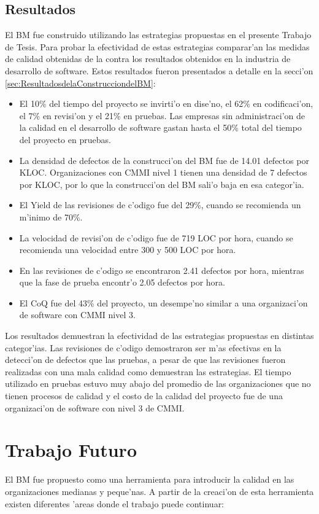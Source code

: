 \subsection{Resultados}
\label{sec:Resultados}
\noindent
El BM fue construido utilizando las estrategias propuestas en el presente Trabajo de Tesis. Para probar la efectividad de estas estrategias comparar'an las medidas de calidad obtenidas de la contra los resultados obtenidos en la industria de desarrollo de software. Estos resultados fueron presentados a detalle en la secci'on \ref{sec:ResultadosdelaConstrucciondelBM}:

\begin{itemize}
	\item El 10\% del tiempo del proyecto se invirti'o en dise'no, el  62\% en codificaci'on, el 7\% en revisi'on y el 21\% en pruebas. Las empresas sin administraci'on de la calidad en el desarrollo de software gastan hasta el 50\% total del tiempo del proyecto en pruebas.
	\item La densidad de defectos de la construcci'on del BM fue de 14.01 defectos por KLOC. Organizaciones con CMMI nivel 1 tienen una densidad de 7 defectos por KLOC\cite{Humphrey}, por lo que la construcci'on del BM sali'o baja en esa categor'ia.
	\item El Yield de las revisiones de c'odigo fue del 29\%, cuando se recomienda un m'inimo de 70\%.
	\item La velocidad de revisi'on de c'odigo fue de 719 LOC por hora, cuando se recomienda una velocidad entre 300 y 500 LOC por hora. 
	\item En las revisiones de c'odigo se encontraron 2.41 defectos por hora, mientras que la fase de prueba encontr'o 2.05 defectos por hora.
	\item El CoQ fue del 43\% del proyecto, un desempe'no similar a una organizaci'on de software con CMMI nivel 3\cite{Humphrey}.
\end{itemize}

Los resultados demuestran la efectividad de las estrategias propuestas en distintas categor'ias. Las revisiones de c'odigo demostraron ser m'as efectivas en la detecci'on de defectos que las pruebas, a pesar de que las revisiones fueron realizadas con una mala calidad como demuestran las estrategias. El tiempo utilizado en pruebas estuvo muy abajo del promedio de las organizaciones que no tienen procesos de calidad y el costo de la calidad del proyecto fue de una organizaci'on de software con nivel 3 de CMMI.

\section{Trabajo Futuro}
\label{sec:TrabajoFuturo}
\noindent
El BM fue propuesto como una herramienta para introducir la calidad en las organizaciones medianas y peque'nas. A partir de la creaci'on de esta herramienta existen diferentes 'areas donde el trabajo puede continuar:

